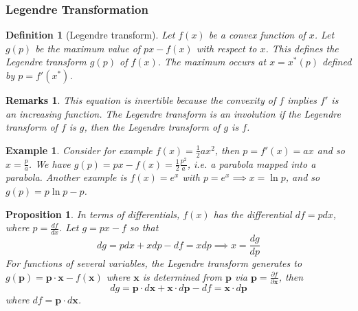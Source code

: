 \documentclass[a4paper]{article}
\newtheorem{defi}{Definition}[section]
\newtheorem{remarks}{Remarks}[section]
\newtheorem{eg}{Example}[section]
\newtheorem{prop}{Proposition}[section]
\theoremstyle{new}
\begin{document}
\subsubsection{Legendre Transformation}
\begin{defi}[Legendre transform]
Let $f(x)$ be a convex function of $x$. Let $g(p)$ be the maximum value of $px-f(x)$ with respect to $x$. This defines the Legendre transform $g(p)$ of $f(x)$. The maximum occurs at $x=x^*(p)$ defined by $p=f'(x^*)$. 
\end{defi}
\begin{remarks}
This equation is invertible because the convexity of $f$ implies $f'$ is an increasing function. The Legendre transform is an involution if the Legendre transform of $f$ is $g$, then the Legendre transform of $g$ is $f$.
\end{remarks}
\begin{eg}
Consider for example $f(x)=\frac{1}{2}ax^2$, then $p=f'(x)=ax$ and so $x=\frac{p}{a}$. We have $g(p)=px-f(x)=\frac{1}{2}\frac{p^2}{a}$, i.e. a parabola mapped into a parabola. Another example is $f(x)=e^x$ with $p=e^x\implies x=\ln p$, and so $g(p)=p\ln p-p$.
\end{eg}
\begin{prop}
In terms of differentials, $f(x)$ has the differential $df=pdx$, where $p=\frac{df}{dx}$. Let $g=px-f$ so that
$$dg=pdx+xdp-df=xdp\implies x=\frac{dg}{dp}$$
For functions of several variables, the Legendre transform generates to $g(\mathbf{p})=\mathbf{p}\cdot\mathbf{x}-f(\mathbf{x})$ where $\mathbf{x}$ is determined from $\mathbf{p}$ via $\mathbf{p}=\frac{\partial f}{\partial\mathbf{x}}$, then 
$$dg=\mathbf{p}\cdot d\mathbf{x}+\mathbf{x}\cdot d\mathbf{p}-df=\mathbf{x}\cdot d\mathbf{p}$$
where $df=\mathbf{p}\cdot d\mathbf{x}$. 
\end{prop}
\end{document}

